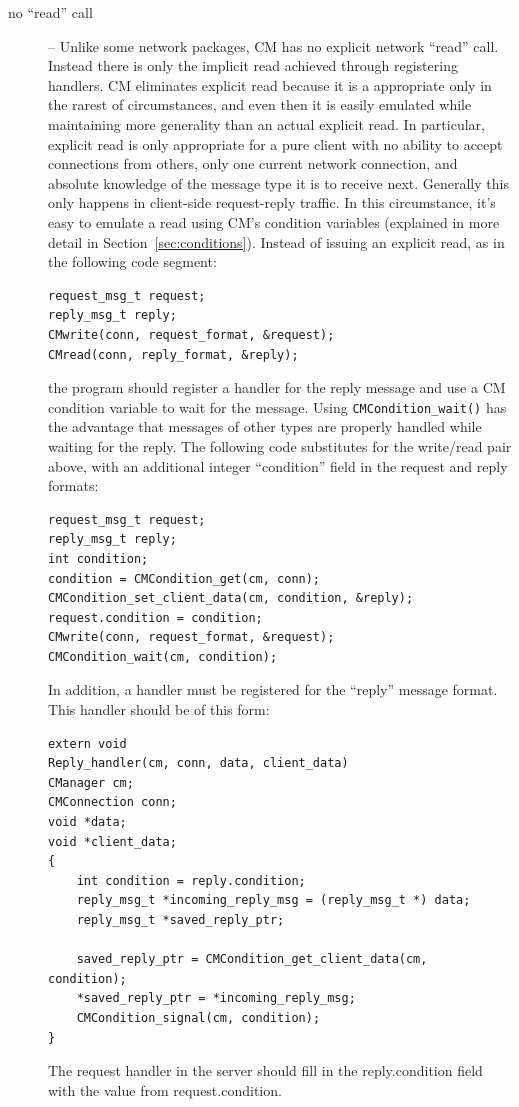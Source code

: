 \documentclass[11pt]{article}
\begin{document}
\begin{description}
\item[no ``read'' call\label{no_read}]  -- Unlike some network packages, CM has no
explicit network ``read'' call.  Instead there is only the implicit read
achieved through registering handlers.  CM eliminates explicit read because
it is a appropriate only in the rarest of circumstances, and even then it is
easily emulated while maintaining more generality than an actual explicit
read.  In particular, explicit read is only appropriate for a pure client with no
ability to accept connections from others, only one current network
connection, and absolute knowledge of the message type it is to receive
next.  Generally this only happens in client-side request-reply traffic.  In
this circumstance, it's easy to emulate a read using CM's condition
variables (explained in more detail in Section~\ref{sec:conditions}).
Instead of issuing an explicit read, as in the following code segment:
\begin{verbatim}
request_msg_t request;
reply_msg_t reply;
CMwrite(conn, request_format, &request);
CMread(conn, reply_format, &reply);
\end{verbatim}
the program should register a handler for the reply message and use a CM
condition variable to wait for the message.  Using {\tt CMCondition\_wait()}
has the advantage that messages of other types are properly handled while
waiting for the reply.  The following code substitutes for the write/read
pair above, with an additional integer ``condition'' field in the request
and reply formats: 
\begin{verbatim}
request_msg_t request;
reply_msg_t reply;
int condition;
condition = CMCondition_get(cm, conn);
CMCondition_set_client_data(cm, condition, &reply);
request.condition = condition;
CMwrite(conn, request_format, &request);
CMCondition_wait(cm, condition);
\end{verbatim}
In addition, a handler must be registered for the ``reply'' message format.
This handler should be of this form:
\begin{verbatim}
extern void
Reply_handler(cm, conn, data, client_data)
CManager cm;
CMConnection conn;
void *data;
void *client_data;
{
    int condition = reply.condition;
    reply_msg_t *incoming_reply_msg = (reply_msg_t *) data;
    reply_msg_t *saved_reply_ptr;

    saved_reply_ptr = CMCondition_get_client_data(cm, condition);
    *saved_reply_ptr = *incoming_reply_msg;
    CMCondition_signal(cm, condition);
}
\end{verbatim}
The request handler in the server should fill in the reply.condition field
with the value from request.condition.
\end{description}
\end{document}
